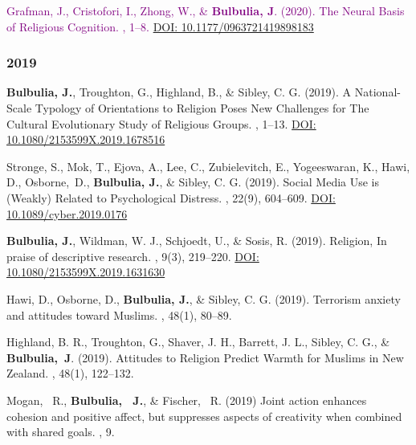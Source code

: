 \documentclass{article}
\begin{document}
\begin{thebibliography}{99}
 \textcolor{purple}{ Grafman, J., Cristofori, I., Zhong, W., \& {\bf Bulbulia, J}. (2020).
\newblock The Neural Basis of Religious Cognition.
, 1--8.
\href{https://doi.org/10.1177/0963721419898183}{DOI: 10.1177/0963721419898183}}



\subsubsection*{2019}



 {\bf Bulbulia, J.}, Troughton, G., Highland, B., \& Sibley, C. G.  (2019).
\newblock A National-Scale Typology of Orientations to Religion Poses New Challenges for The Cultural Evolutionary Study of Religious Groups. 
, 1--13. 
\href{https://doi.org/10.1080/2153599X.2019.1678516}{DOI: 10.1080/2153599X.2019.1678516}


 Stronge, S., Mok, T., Ejova, A., Lee, C., Zubielevitch, E., Yogeeswaran, K., Hawi, D., Osborne,~D., {\bf Bulbulia, J.}, \& Sibley, C. G. (2019).
\newblock Social Media Use is (Weakly) Related to Psychological Distress. 
, 22(9), 604--609.
\href{https://doi.org/10.1089/cyber.2019.0176}{DOI: 10.1089/cyber.2019.0176}


{\bf  Bulbulia, J.}, Wildman, W. J., Schjoedt, U., \& Sosis, R. (2019).
\newblock Religion, In praise of descriptive research.  
, 9(3), 219--220. 
\href{https://doi.org/10.1080/2153599X.2019.1631630}{DOI: 10.1080/2153599X.2019.1631630}


Hawi, D., Osborne, D., {\bf Bulbulia, J.}, \& Sibley, C. G. (2019). 
\newblock Terrorism anxiety and attitudes toward Muslims. 
, 48(1), 80--89.


Highland, B. R., Troughton, G., Shaver, J. H., Barrett, J. L., Sibley, C. G., \&
{\bf Bulbulia,~J}. (2019).
\newblock  Attitudes to Religion Predict Warmth for Muslims in New Zealand.
,  48(1), 122--132.


Mogan, ~R., {\bf Bulbulia, ~J.}, \& Fischer, ~R. (2019)
\newblock Joint action enhances cohesion and positive affect, but suppresses aspects of creativity when combined with shared goals.
, 9.



\end{thebibliography}
\end{document}
